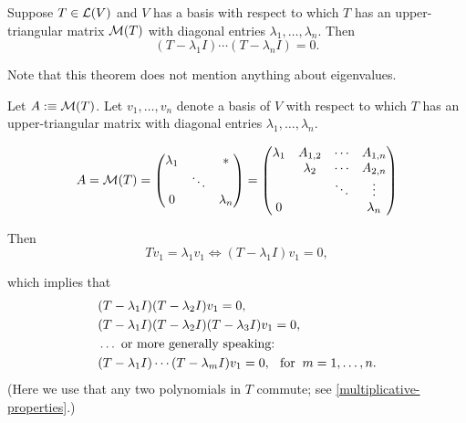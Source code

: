 \begin{thm}
  \label{thm: equation satisfied by operator with upper triangular matrix}
  Suppose $T\in \mathcal{L}(V)$ and $V$ has a basis with respect to which $T$ has an upper-triangular matrix $\mathcal{M}(T)$ with diagonal entries $\lambda_1, \dots, \lambda_n$. Then
  \begin{equation}
    (T-\lambda_1I) \cdots (T-\lambda_nI)=0.
  \end{equation}

  Note that this theorem does not mention anything about eigenvalues.
\end{thm}
\begin{prf}
  Let $A :\equiv \mathcal{M}(T)$. Let $v_1, \ldots, v_n$ denote a basis of $V$ with respect to which $T$ has an upper-triangular matrix with diagonal entries $\lambda_1, \ldots, \lambda_n$.

  \begin{minipage}{\linewidth}
  \begin{equation}
    A = \mathcal{M}(T)
    =
    \begin{pmatrix}
        \lambda_1 &         &  * \\
                  &  \ddots &    \\
        0         &         & \lambda_n
    \end{pmatrix}
    =
    \begin{pmatrix}
       \lambda_1&  A_{1,2}  &  \cdots &  A_{1,n} \\
                & \lambda_2 &  \cdots &  A_{2,n} \\
                &           &  \ddots &  \vdots  \\
          0     &           &         & \lambda_n
    \end{pmatrix}
  \end{equation}
  \end{minipage}

  Then
  \begin{equation}
    \label{i-need-a-ref}
    T v_1 = \lambda_1 v_1 \iff (T-\lambda_1 I)  v_1 = 0,
  \end{equation}

  which implies that
  \begin{equation}
\begin{aligned}
    &(T-\lambda_1 I)(T-\lambda_2 I)  v_1 =0, \\
    &(T-\lambda_1 I)(T-\lambda_2 I)(T-\lambda_3 I)  v_1 =0, \\
    &\ldots \text{ or more generally speaking:} \\
    &(T-\lambda_1 I) \cdots (T-\lambda_m I) v_1 = 0,
     \;\;\, \text{for}\;\; m = 1, \ldots, n.
\end{aligned}
  \end{equation}
  (Here we use that any two polynomials in $T$ commute; see \ref{multiplicative-properties}.)
  \bigbreak


\end{prf}

